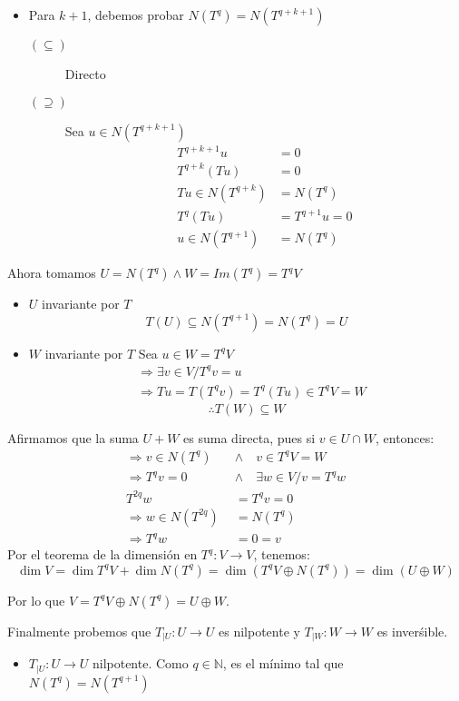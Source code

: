 \documentclass[10pt,a4paper]{article}
\begin{document}
\begin{itemize}
\begin{itemize}
			\item Para $k+1$, debemos probar $N\left(T^{q}\right) = N\left(T^{q+k+1}\right)$
				\begin{description}
					\item[$(\subseteq)$] Directo
					\item[$(\supseteq)$] Sea $u\in N\left(T^{q+k+1}\right)$
						\begin{align*}
							T^{q+k+1}u &= 0\\
							T^{q+k}(Tu) &= 0\\
							Tu \in N(T^{q+k}) & = N(T^{q})\\
							T^{q}(Tu) & = T^{q+1} u= 0 \\
							u \in N(T^{q+1}) &= N(T^{q})
						\end{align*}
				\end{description}
		\end{itemize}
		Ahora tomamos $U = N(T^{q})\wedge W = Im(T^{q}) = T^{q}V$
		\begin{itemize}
			\item $U$ invariante por $T$
				$$T(U)\subseteq N(T^{q+1}) = N(T^{q}) = U$$
			\item $W$ invariante por $T$
				Sea $u\in W = T^{q}V$ 
				\begin{align*}
					& \Rightarrow\exists v\in V/ T^{q}v = u\\
					& \Rightarrow Tu = T(T^{q}v) = T^{q}(Tu)\in T^{q}V = W
				\end{align*}
				$$\therefore T(W)\subseteq W$$				
		\end{itemize}
		Afirmamos que la suma $U+W$ es suma directa, pues si $v\in U\cap W$, entonces:
		\begin{align*}
			\Rightarrow v\in N(T^{q})\quad &\wedge\quad v\in T^{q}V = W\\
			\Rightarrow	T^{q}v = 0\quad &\wedge\quad\exists w\in V/ v = T^{q}w\\
			T^{2q}w & = T^{q}v = 0 \\
			\Rightarrow w\in N(T^{2q}) & = N(T^{q})\\
			\Rightarrow T^{q}w & = 0 = v 
		\end{align*}
		Por el teorema de la dimensión en $T^{q}:V\rightarrow V$, tenemos:
		$$\dim V = \dim T^{q}V  + \dim N(T^{q}) = \dim (T^{q}V\oplus N(T^{q})) = \dim (U\oplus W)$$
		
		Por lo que $V = T^{q}V \oplus N(T^{q}) = U\oplus W$.
		
		Finalmente probemos que $T_{|U}:U\rightarrow U$ es nilpotente y $T_{|W}:W\rightarrow W$ es inverśible.
		\begin{itemize}
			\item $T_{|U}:U\rightarrow U$ nilpotente.
			Como $q\in\mathbb{N}$, es el mínimo tal que $ N(T^{q}) = N(T^{q+1})$
			

\end{itemize}
\end{itemize}
\end{document}
